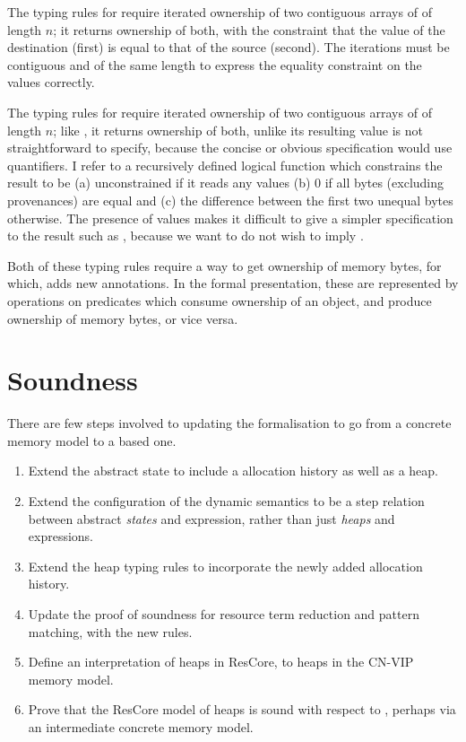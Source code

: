 The typing rules for  require iterated ownership of two
contiguous arrays of  of length $n$; it returns ownership of
both, with the constraint that the value of the destination (first) is equal to
that of the source (second). The iterations must be contiguous and of the same
length to express the equality constraint on the values correctly.

The typing rules for  require iterated ownership of two
contiguous arrays of  of length $n$; like , it
returns ownership of both, unlike  its resulting value is not
straightforward to specify, because the concise or obvious specification would
use quantifiers. I refer to a recursively defined logical function which
constrains the result to be (a) unconstrained if it reads any
 values (b) 0 if all bytes (excluding provenances) are equal
and (c) the difference between the first two unequal bytes otherwise. The presence
of  values makes it difficult to give a simpler specification
to the result such as , because we want to do not wish to imply %
.

Both of these typing rules require a way to get ownership of memory bytes, for
which,  adds new annotations.
In the formal presentation, these are represented by operations on predicates
which consume ownership of an object, and produce ownership of memory bytes, or
vice versa.

\section{Soundness}\label{sec:cn-vip-soundness}

There are few steps involved to updating the formalisation to go from a concrete
memory model to a  based one.
\begin{enumerate}
    \item Extend the abstract state to include a allocation history as well as a heap.
    \item Extend the configuration of the dynamic semantics to be a step
        relation between abstract \emph{states} and expression, rather than
        just \emph{heaps} and expressions.
    \item Extend the heap typing rules to incorporate the newly added
        allocation history.
    \item Update the proof of soundness for resource term reduction and pattern
        matching, with the new rules.
    \item Define an interpretation of heaps in ResCore, to heaps in the CN-VIP
        memory model.
    \item Prove that the ResCore model of heaps is sound with respect to
        , perhaps via an intermediate concrete memory model.
\end{enumerate}

